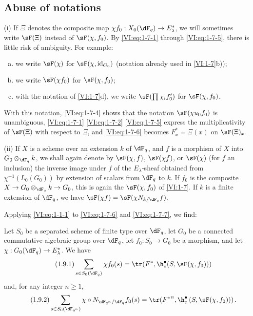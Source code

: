 \subsection{Abuse of notations}\label{VI:1-8}

(i) If $\Xi$ denotes the composite map 
$\chi f_0:X_0(\dF_q) \to E_\lambda^\ast$, we will sometimes write $\sF(\Xi)$ 
instead of $\sF(\chi,f_0)$. By \eqref{VI:eq:1-7-1} through \eqref{VI:eq:1-7-5}, 
there is little risk of ambiguity. For example:
\begin{enumerate}[a)]
  \item we write $\sF(\chi)$ for $\sF(\chi,\operatorname{id}_{G_0})$ 
    (notation already used in \ref{VI:1-7}b)); 
  \item we write $\sF(\chi f_0)$ for $\sF(\chi,f_0)$;
  \item with the notation of \ref{VI:1-7}d), we write 
    $\sF(\prod \chi_i f_0^i)$ for $\sF(\chi,f_0)$. 
\end{enumerate}

With this notation, \eqref{VI:eq:1-7-4} shows that the notation 
$\sF(\chi u_0 f_0)$ is unambiguous, \eqref{VI:eq:1-7-1} \eqref{VI:eq:1-7-2} 
\eqref{VI:eq:1-7-5} express the multiplicativity of $\sF(\Xi)$ with respect to $\Xi$, 
and \eqref{VI:eq:1-7-6} becomes $F_x^\ast = \Xi(x)$ on $\sF(\Xi)_x$.

(ii) If $X$ is a scheme over an extension $k$ of $\dF_q$, and $f$ is a 
morphism of $X$ into $G_0\otimes_{\dF_q} k$, we shall again denote by $\sF(\chi,f)$, 
$\sF(\chi f)$, or $\sF(\chi)$ (for $f$ an inclusion) the inverse image under 
$f$ of the $E_\lambda$-sheaf obtained from $\chi^{-1}(L_0(G_0))$ by extension of 
scalars from $\dF_q$ to $k$. If $f_0$ is the composite 
$X\to G_0\otimes_{\dF_q} k \to G_0$, this is again the $\sF(\chi,f_0)$ of 
\ref{VI:1-7}. If $k$ is a finite extension of $\dF_q$, we have 
$\sF(\chi f) = \sF(\chi N_{k/\dF_q} f)$. 

Applying \eqref{VI:eq:1-1-1} to \eqref{VI:eq:1-7-6} and \eqref{VI:eq:1-7-7}, 
we find: 





\begin{theorem_}\label{VI:1-9}
Let $S_0$ be a separated scheme of finite type over $\dF_q$, let $G_0$ be a 
connected commutative algebraic group over $\dF_q$, let $f_0:S_0\to G_0$ be a morphism, and let 
$\chi:G_0(\dF_q) \to E_\lambda^\ast$. We have 
\begin{equation*}\tag{1.9.1}\label{VI:eq:1-9-1}
  \sum_{s\in S_0(\dF_q)} \chi f_0(s) = \tr(F^\ast,\h_c^\bullet(S,\sF(\chi,f_0))) 
\end{equation*}
and, for any integer $n\geqslant 1$,
\begin{equation*}\tag{1.9.2}\label{VI:eq:1-9-2}
  \sum_{s\in S_0(\dF_{q^n})} \chi\circ N_{\dF_{q^n}/\dF_q} f_0(s) = \tr({F^\ast}^n, \h_c^\bullet\left(S,\sF(\chi,f_0))\right) \text{.}
\end{equation*}
\end{theorem_}





